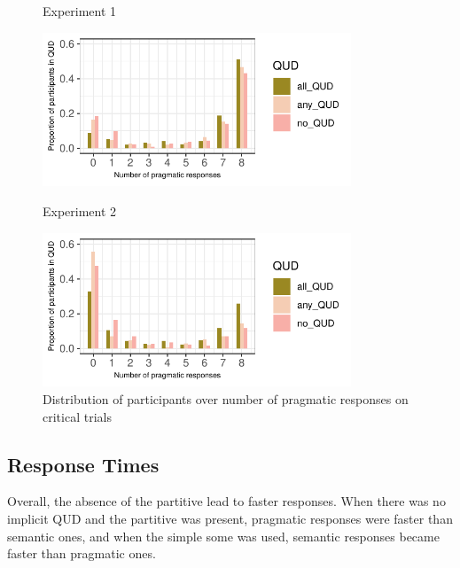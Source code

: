 \documentclass[12pt]{article}
\begin{document}
\begin{figure}[!ht] 
    \begin{minipage}{.5\textwidth}
    \caption*{Experiment 1}
    \includegraphics[height=4.6cm]{img/exp4_pragmatic_proportion.pdf}
    \end{minipage}%
    \begin{minipage}{.5\textwidth}
    \caption*{Experiment 2}
    \includegraphics[height=4.6cm]{img/exp5_pragmatic_proportion.pdf}
    \end{minipage}%
    \caption{Distribution of participants over number of pragmatic responses on critical trials}
\end{figure}

\subsection*{Response Times}
Overall, the absence of the partitive lead to faster responses. When there was no implicit QUD and the partitive was present, pragmatic responses were faster than semantic ones, and when the simple some was used, semantic responses became faster than pragmatic ones. 
\end{document}
